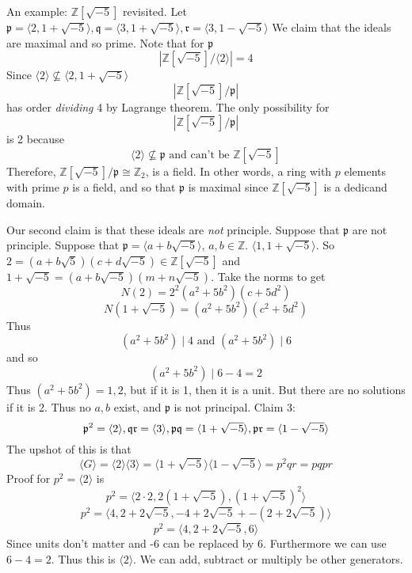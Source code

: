 \documentclass{article}
\begin{document}
An example: $\mathbb{Z}[\sqrt{-5}]$ revisited. Let $\mathfrak{p} = \langle 2, 1
+ \sqrt{-5} \rangle, \mathfrak{q} = \langle 3, 1 + \sqrt{-5} \rangle, 
\mathfrak{r} = \langle 3, 1 - \sqrt{-5} \rangle$
We claim that the ideals are maximal and so prime. Note that for $\mathfrak{p}$
\[ \left| \mathbb{Z}[\sqrt{-5}]/\langle 2 \rangle \right| = 4 \]
Since $\langle 2 \rangle\not\subseteq \langle 2, 1 + \sqrt{-5} \rangle$
\[ \left|\mathbb{Z}[\sqrt{-5}]/\mathfrak{p}\right| \]
has order \emph{dividing} 4 by Lagrange theorem. The only possibility for 
\[ \left|\mathbb{Z}[\sqrt{-5}]/\mathfrak{p}\right| \]
is 2 because
\[ \langle 2 \rangle \not \subseteq \mathfrak{p} \text{ and can't be }
\mathbb{Z}[\sqrt{-5}] \]
Therefore, $\mathbb{Z}[\sqrt{-5}] / \mathfrak{p} \cong \mathbb{Z}_2$, is a
field. In other words, a ring with $p$ elements with prime $p$ is a field, and
so that $\mathfrak{p}$ is maximal since $\mathbb{Z}[\sqrt{-5}]$ is a dedicand
domain. 

Our second claim is that these ideals are \emph{not} principle. Suppose that
$\mathfrak{p}$ are not principle. Suppose that $\mathfrak{p} = \langle a + b
\sqrt{-5} \rangle $, $a,b \in \mathbb{Z}$. $\langle 1, 1+\sqrt{-5}\rangle$. So
$2 = (a + b\sqrt{5})(c+d\sqrt{-5}) \in \mathbb{Z}[\sqrt{-5}] $ and 
$1 + \sqrt{-5} = (a + b\sqrt{-5})(m+n\sqrt{-5})$. Take the norms to get 
\[ N(2) = 2^2 (a^2 + 5b^2)(c+5d^2) \]
\[ N(1+\sqrt{-5}) = (a^2+5b^2) (c^2 + 5d^2) \]
Thus
\[ (a^2+5b^2) \mid 4 \text{ and } (a^2+5b^2) \mid 6  \]
and so
\[ (a^2+5b^2) \mid 6 - 4 = 2 \]
Thus $(a^2+5b^2)  = 1, 2$, but if it is 1, then it is a unit. But there are no
solutions if it is 2. Thus no $a,b$ exist, and $\mathfrak{p}$ is not principal.
Claim 3: 
\[ \mathfrak{p}^2 = \langle 2 \rangle, \mathfrak{q}\frak{r} = \langle3\rangle,
\mathfrak{pq} = \langle 1 + \sqrt{-5} \rangle, \mathfrak{pr} = \langle 1 -
\sqrt{-5} \rangle \]
The upshot of this is that 
\[ \langle G \rangle = \langle 2 \rangle \langle 3 \rangle = \langle 1 +
\sqrt{-5} \rangle \langle 1 - \sqrt{-5} \rangle = p^2 qr = pqpr \]
Proof for $p^2 = \langle 2 \rangle$ is
\[ p^2 = \langle 2\cdot2 , 2(1+\sqrt{-5}), (1+\sqrt{-5})^2 \rangle \]
\[ p^2 = \langle 4, 2 + 2\sqrt{-5}, -4+2\sqrt{-5} +-(2+2\sqrt{-5}) \rangle \]
\[ p^2 = \langle 4, 2+2\sqrt{-5}, 6 \rangle \]
Since units don't matter and -6 can be replaced by 6. Furthermore we can use
$6-4 = 2$. Thus this is $\langle 2 \rangle $. We can add, subtract or multiply
be other generators.
\end{document}
